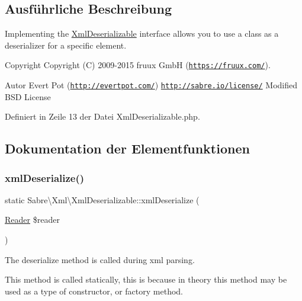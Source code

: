 \subsection{Ausführliche Beschreibung}
Implementing the \mbox{\hyperlink{interface_sabre_1_1_xml_1_1_xml_deserializable}{Xml\+Deserializable}} interface allows you to use a class as a deserializer for a specific element.

\begin{DoxyCopyright}{Copyright}
Copyright (C) 2009-\/2015 fruux GmbH (\href{https://fruux.com/}{\tt https\+://fruux.\+com/}). 
\end{DoxyCopyright}
\begin{DoxyAuthor}{Autor}
Evert Pot (\href{http://evertpot.com/}{\tt http\+://evertpot.\+com/})  \href{http://sabre.io/license/}{\tt http\+://sabre.\+io/license/} Modified B\+SD License 
\end{DoxyAuthor}


Definiert in Zeile 13 der Datei Xml\+Deserializable.\+php.



\subsection{Dokumentation der Elementfunktionen}
\mbox{\label{interface_sabre_1_1_xml_1_1_xml_deserializable_a19e0eca545b9a0d93f7d6b69085ade30}} 
\subsubsection{\texorpdfstring{xml\+Deserialize()}{xmlDeserialize()}}
{\footnotesize\ttfamily static Sabre\textbackslash{}\+Xml\textbackslash{}\+Xml\+Deserializable\+::xml\+Deserialize (\begin{DoxyParamCaption}\item[{\mbox{\hyperlink{class_sabre_1_1_xml_1_1_reader}{Reader}}}]{\$reader }\end{DoxyParamCaption})\hspace{0.3cm}{\ttfamily [static]}}

The deserialize method is called during xml parsing.

This method is called statically, this is because in theory this method may be used as a type of constructor, or factory method.

